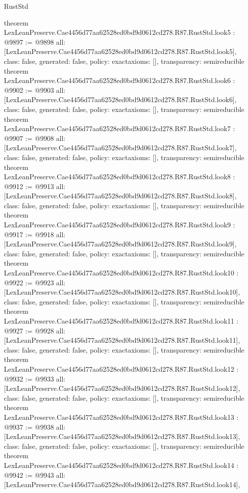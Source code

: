 \begin{lexlean}{RustStd}
\begin{coremodule}
{}
theorem LexLeanPreserve.Cae4456d77aa62528ed0bd9d0612cd278.R87.RustStd.look5 : @9897 := @9898 {
  all: [LexLeanPreserve.Cae4456d77aa62528ed0bd9d0612cd278.R87.RustStd.look5],
  class: false,
  generated: false,
  policy: exact{axioms: []},
  transparency: semireducible
}
theorem LexLeanPreserve.Cae4456d77aa62528ed0bd9d0612cd278.R87.RustStd.look6 : @9902 := @9903 {
  all: [LexLeanPreserve.Cae4456d77aa62528ed0bd9d0612cd278.R87.RustStd.look6],
  class: false,
  generated: false,
  policy: exact{axioms: []},
  transparency: semireducible
}
theorem LexLeanPreserve.Cae4456d77aa62528ed0bd9d0612cd278.R87.RustStd.look7 : @9907 := @9908 {
  all: [LexLeanPreserve.Cae4456d77aa62528ed0bd9d0612cd278.R87.RustStd.look7],
  class: false,
  generated: false,
  policy: exact{axioms: []},
  transparency: semireducible
}
theorem LexLeanPreserve.Cae4456d77aa62528ed0bd9d0612cd278.R87.RustStd.look8 : @9912 := @9913 {
  all: [LexLeanPreserve.Cae4456d77aa62528ed0bd9d0612cd278.R87.RustStd.look8],
  class: false,
  generated: false,
  policy: exact{axioms: []},
  transparency: semireducible
}
theorem LexLeanPreserve.Cae4456d77aa62528ed0bd9d0612cd278.R87.RustStd.look9 : @9917 := @9918 {
  all: [LexLeanPreserve.Cae4456d77aa62528ed0bd9d0612cd278.R87.RustStd.look9],
  class: false,
  generated: false,
  policy: exact{axioms: []},
  transparency: semireducible
}
theorem LexLeanPreserve.Cae4456d77aa62528ed0bd9d0612cd278.R87.RustStd.look10 : @9922 := @9923 {
  all: [LexLeanPreserve.Cae4456d77aa62528ed0bd9d0612cd278.R87.RustStd.look10],
  class: false,
  generated: false,
  policy: exact{axioms: []},
  transparency: semireducible
}
theorem LexLeanPreserve.Cae4456d77aa62528ed0bd9d0612cd278.R87.RustStd.look11 : @9927 := @9928 {
  all: [LexLeanPreserve.Cae4456d77aa62528ed0bd9d0612cd278.R87.RustStd.look11],
  class: false,
  generated: false,
  policy: exact{axioms: []},
  transparency: semireducible
}
theorem LexLeanPreserve.Cae4456d77aa62528ed0bd9d0612cd278.R87.RustStd.look12 : @9932 := @9933 {
  all: [LexLeanPreserve.Cae4456d77aa62528ed0bd9d0612cd278.R87.RustStd.look12],
  class: false,
  generated: false,
  policy: exact{axioms: []},
  transparency: semireducible
}
theorem LexLeanPreserve.Cae4456d77aa62528ed0bd9d0612cd278.R87.RustStd.look13 : @9937 := @9938 {
  all: [LexLeanPreserve.Cae4456d77aa62528ed0bd9d0612cd278.R87.RustStd.look13],
  class: false,
  generated: false,
  policy: exact{axioms: []},
  transparency: semireducible
}
theorem LexLeanPreserve.Cae4456d77aa62528ed0bd9d0612cd278.R87.RustStd.look14 : @9942 := @9943 {
  all: [LexLeanPreserve.Cae4456d77aa62528ed0bd9d0612cd278.R87.RustStd.look14],
}
\end{coremodule}
\end{lexlean}
